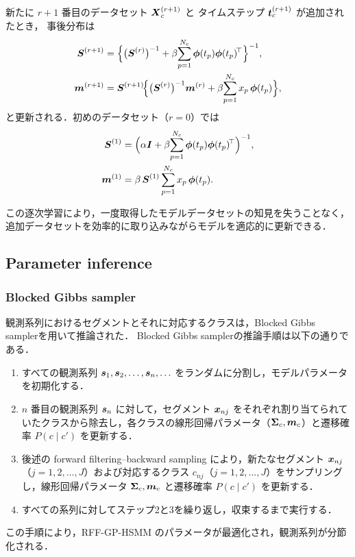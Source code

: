 \documentclass[conference]{IEEEtran}
\begin{document}
新たに $r\!+\!1$ 番目のデータセット  
${ \boldsymbol X}_c^{(r+1)}$ と
タイムステップ ${ \boldsymbol t}_c^{(r+1)}$ が追加されたとき，
事後分布は
\begin{align}
  \bS^{(r+1)}
    &=\Bigl\{\bigl(\bS^{(r)}\bigr)^{-1}
              +\beta\!\sum_{p=1}^{N_c}
                \bphi(t_p)\bphi(t_p)^{\!\top}\Bigr\}^{-1},
        \label{eq:inc_S}\\
  \bm^{(r+1)}
    &=\bS^{(r+1)}\!
      \Bigl\{\bigl(\bS^{(r)}\bigr)^{-1}\bm^{(r)}
               +\beta\!\sum_{p=1}^{N_c}
                 x_p\,\bphi(t_p)\Bigr\},
        \label{eq:inc_m}
\end{align}
と更新される．初めのデータセット（$r=0$）では
\begin{align}
  { \boldsymbol S}^{(1)}
    &= \Bigl(\alpha{ \boldsymbol I}
        + \beta\!\sum_{p=1}^{N_c}
          {\boldsymbol\phi}(t_p){\boldsymbol\phi}(t_p)^{\!\top}\Bigr)^{-1},\\
  { \boldsymbol m}^{(1)}
    &= \beta\,{ \boldsymbol S}^{(1)}
       \sum_{p=1}^{N_c} x_p\,{\boldsymbol\phi}(t_p).
\end{align}

この逐次学習\cite{Broderick2013}により，一度取得したモデルデータセットの知見を失うことなく，追加データセットを効率的に取り込みながらモデルを適応的に更新できる．

\subsection{Parameter inference}
\subsubsection{Blocked Gibbs sampler}
観測系列におけるセグメントとそれに対応するクラスは，Blocked Gibbs samplerを用いて推論された．  
Blocked Gibbs samplerの推論手順は以下の通りである．
%
\begin{enumerate}
 \item すべての観測系列 ${ \boldsymbol s}_1, { \boldsymbol s}_2, \ldots, { \boldsymbol s}_n, \ldots$ をランダムに分割し，モデルパラメータを初期化する．
 \item $n$ 番目の観測系列 ${ \boldsymbol s}_n$ に対して，セグメント ${ \boldsymbol x}_{nj}$ をそれぞれ割り当てられていたクラスから除去し，各クラスの線形回帰パラメータ（${\boldsymbol\Sigma}_c, { \boldsymbol m}_c$）と遷移確率 $P(c \mid c')$ を更新する．
 \item 後述の forward filtering–backward sampling により，新たなセグメント ${ \boldsymbol x}_{nj}$（$j = 1, 2, \dots, J$）および対応するクラス $c_{nj}$（$j = 1, 2, \dots, J$）をサンプリングし，線形回帰パラメータ ${\boldsymbol\Sigma}_c, { \boldsymbol m}_c$ と遷移確率 $P(c \mid c')$ を更新する．
 \item すべての系列に対してステップ2と3を繰り返し，収束するまで実行する．
\end{enumerate}
%
この手順により，RFF-GP-HSMM のパラメータが最適化され，観測系列が分節化される．
\end{document}
